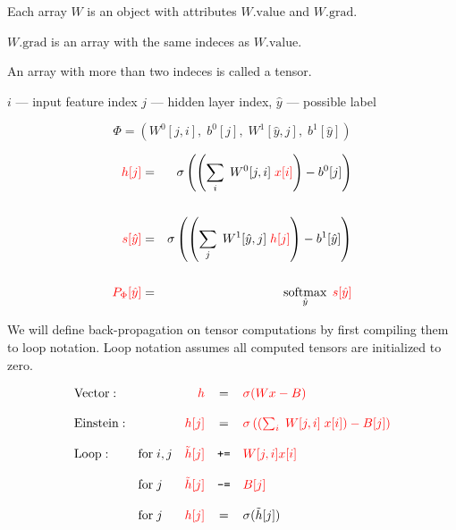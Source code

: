 {\vfill
Each array {\color{red} $W$} is an object with attributes {\color{red} $W.\mathrm{value}$} and {\color{red} $W.\mathrm{grad}$}.

\vfill
{\color{red} $W.\mathrm{grad}$} is an array with the same indeces as {\color{red} $W.\mathrm{value}$}.

\vfill
An array with more than two indeces is called a {\color{red} tensor}.


\centerline{$i$ --- input feature index \hspace{1em} $j$  --- hidden layer index, \hspace{1em} $\hat{y}$ --- possible label}
$$\Phi = (W^0[j,i],\;b^0[j],\;W^1[\hat{y},j],\;b^1[\hat{y}])$$

\vfill
\begin{eqnarray*}
  {\color{red} h[j]} & = & \sigma\left(\left(\sum_i\;W^0[j,i] \;{\color{red} x[i]}\right) - b^0[j]\right) \\
  \\
  {\color{red} s[\hat{y}]} & = & \sigma\left(\left(\sum_j\;W^1[\hat{y},j]\;{\color{red} h[j]}\right) - b^1[\hat{y}]\right) \\
  \\
  {\color{red} P_\Phi[\hat{y}]} & = & \operatorname*{softmax}_{\hat{y}}\;{\color{red} s[\hat{y}]}
\end{eqnarray*}


We will define back-propagation on tensor computations by first compiling them to loop notation.
Loop notation assumes all computed tensors are initialized to zero.

\vfill
$$\begin{array}{llrcl}

\mathrm{Vector:} & & {\color{red} h} & = & {\color{red} \sigma(Wx -B)} \\
\\
\mathrm{Einstein:} & &  {\color{red} h[j]} & = & {\color{red} \sigma\left(\left(\sum_i\;W[j,i] \;x[i]\right) - B[j]\right)} \\
  \\
\mathrm{Loop:} & \mathrm{for}\;i,j & {\color{red} \tilde{h}[j]} & \pluseq & {\color{red} W[j,i]x[i]} \\
\\
& \mathrm{for}\;j & {\color{red} \tilde{h}[j]} & \minuseq & {\color{red} B[j]} \\
  \\
& \mathrm{for}\;j & {\color{red} h[j]} & = & \sigma(\tilde{h}[j]) \\
\end{array}$$

}
